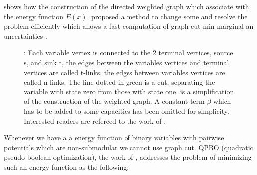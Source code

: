  shows how the
construction of the directed weighted graph which associate with the energy function $E(x)$.
\citet{kohli_2007_pami} proposed a method to change some and resolve
the problem efficiently which allows a fast computation
of graph cut min marginal an uncertainties \citep{kohli_2006_eccv,tarlow_2012_cvpr}.


\begin{figure}[H]
\begin{center}
\hspace{1.5cm}
\end{center}
\caption{
    : Each variable vertex is connected to the 2 terminal vertices, source s, and
        sink t, the edges between the variables vertices and terminal vertices are
        called t-links, the edges between variables vertices are called n-links. The
        line dotted in green is a cut, separating the variable with state zero from
        those with state one.
     is a simplification of the construction of the weighted graph.
        A constant term $\beta$ which has to be added to some capacities
        has been omitted for simplicity. 
        Interested readers are refereed to  the work of \citet{kolmogorov_2004_pami}.
}\label{fig:graph_cut}
\end{figure}


Whenever we have a a energy function of binary variables with pairwise potentials which
are non-submodular we cannot use graph cut. QPBO (quadratic pseudo-boolean optimization), 
the work of \citet{rother_2007_cvpr}, 
addresses the problem of minimizing such an energy function as the
following:

